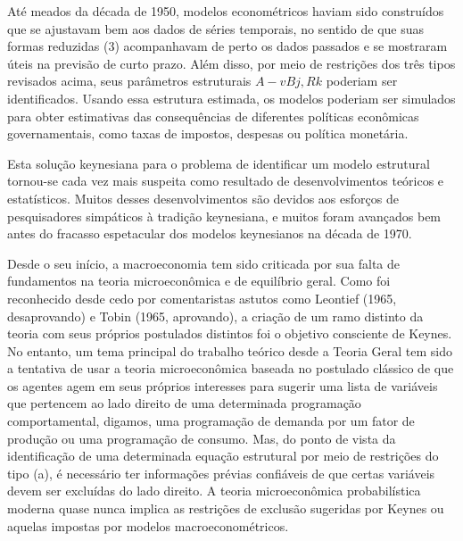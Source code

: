 \documentclass[12pt]{article}
\begin{document}
Até meados da década de 1950, modelos econométricos haviam sido construídos que se ajustavam bem aos dados de séries temporais, no sentido de que suas formas reduzidas (3) acompanhavam de perto os dados passados e se mostraram úteis na previsão de curto prazo. Além disso, por meio de restrições dos três tipos revisados acima, seus parâmetros estruturais $A-v Bj, Rk$ poderiam ser identificados. Usando essa estrutura estimada, os modelos poderiam ser simulados para obter estimativas das consequências de diferentes políticas econômicas governamentais, como taxas de impostos, despesas ou política monetária.

Esta solução keynesiana para o problema de identificar um modelo estrutural tornou-se cada vez mais suspeita como resultado de desenvolvimentos teóricos e estatísticos. Muitos desses desenvolvimentos são devidos aos esforços de pesquisadores simpáticos à tradição keynesiana, e muitos foram avançados bem antes do fracasso espetacular dos modelos keynesianos na década de 1970.

Desde o seu início, a macroeconomia tem sido criticada por sua falta de fundamentos na teoria microeconômica e de equilíbrio geral. Como foi reconhecido desde cedo por comentaristas astutos como Leontief (1965, desaprovando) e Tobin (1965, aprovando), a criação de um ramo distinto da teoria com seus próprios postulados distintos foi o objetivo consciente de Keynes. No entanto, um tema principal do trabalho teórico desde a Teoria Geral tem sido a tentativa de usar a teoria microeconômica baseada no postulado clássico de que os agentes agem em seus próprios interesses para sugerir uma lista de variáveis que pertencem ao lado direito de uma determinada programação comportamental, digamos, uma programação de demanda por um fator de produção ou uma programação de consumo. Mas, do ponto de vista da identificação de uma determinada equação estrutural por meio de restrições do tipo (a), é necessário ter informações prévias confiáveis de que certas variáveis devem ser excluídas do lado direito. A teoria microeconômica probabilística moderna quase nunca implica as restrições de exclusão sugeridas por Keynes ou aquelas impostas por modelos macroeconométricos.
\end{document}
